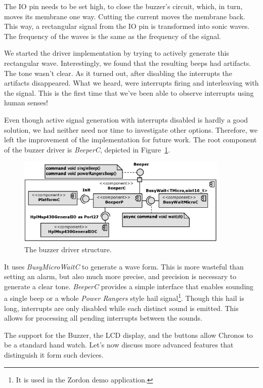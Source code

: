 The IO pin needs to be set high, to close the buzzer's circuit, which, in turn, moves its membrane one way. Cutting the current moves the membrane back. This way, a rectangular signal from the IO pin is transformed into sonic waves. The frequency of the waves is the same as the frequency of the signal.

We started the driver implementation by trying to actively generate this rectangular wave. Interestingly, we found that the resulting beeps had artifacts. The tone wasn't clear. As it turned out, after disabling the interrupts the artifacts disappeared. What we heard, were interrupts firing and interleaving with the signal. This is the first time that we've been able to observe interrupts using human senses!

Even though active signal generation with interrupts disabled is hardly a good solution, we had neither need nor time to investigate other options. Therefore, we left the improvement of the implementation for future work. The root component of the buzzer driver is \emph{BeeperC}, depicted in Figure~\ref{fig:buzzer_c}.
\begin{figure}[h]
  \centering
  \includegraphics[width=0.9\textwidth]{diagrams/buzzer_c.eps}
  \caption{The buzzer driver structure.}
  \label{fig:buzzer_c}
\end{figure}
It uses \emph{BusyMicroWaitC} to generate a wave form. This is more wasteful than setting an alarm, but also much more precise, and precision is necessary to generate a clear tone. \emph{BeeperC} provides a simple interface that enables sounding a single beep or a whole \emph{Power Rangers} style hail signal\footnote{It is used in the Zordon demo application.}. Though this hail is long, interrupts are only disabled while each distinct sound is emitted. This allows for processing all pending interrupts between the sounds.

The support for the Buzzer, the LCD display, and the buttons allow Chronos to be a standard hand watch. Let's now discuss more advanced features that distinguish it form such devices.

